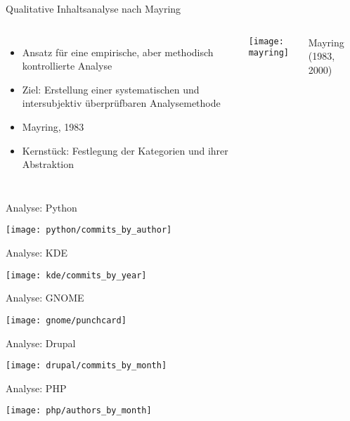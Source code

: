 \documentclass[11pt]{beamer}
\begin{document}
\begin{frame}[t]{Qualitative Inhaltsanalyse nach Mayring}
  \begin{columns}
    \begin{itemize}
      \item Ansatz für eine empirische, aber methodisch kontrollierte Analyse
      \item Ziel: Erstellung einer systematischen und intersubjektiv überprüfbaren Analysemethode
      \item Mayring, 1983
      \item Kernstück: Festlegung der Kategorien und ihrer Abstraktion
    \end{itemize}
    \texttt{[image: mayring]}

    {\tiny\hfill
    Mayring (1983, 2000)
    }
  \end{columns}
\end{frame}

\begin{frame}{Analyse: Python}
  \begin{center}
    \texttt{[image: python/commits\_by\_author]}
  \end{center}
\end{frame}

\begin{frame}{Analyse: KDE}
  \begin{center}
    \texttt{[image: kde/commits\_by\_year]}
  \end{center}
\end{frame}

\begin{frame}{Analyse: GNOME}
  \begin{center}
    \texttt{[image: gnome/punchcard]}
  \end{center}
\end{frame}

\begin{frame}{Analyse: Drupal}
  \begin{center}
    \texttt{[image: drupal/commits\_by\_month]}
  \end{center}
\end{frame}

\begin{frame}{Analyse: PHP}
  \begin{center}
    \texttt{[image: php/authors\_by\_month]}
  \end{center}
\end{frame}
\end{document}
